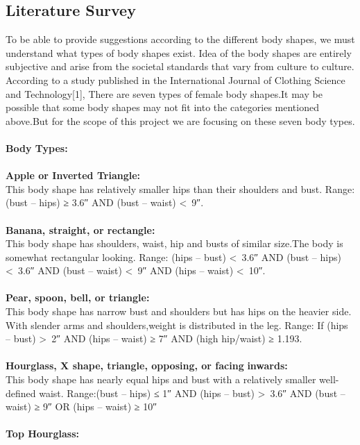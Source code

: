 \documentclass[11pt,journal,compsoc]{IEEEtran}
\begin{document}
\subsection{Literature Survey}
To be able to provide suggestions according to the different body shapes, we must understand what types of body shapes exist. Idea of the body shapes are entirely subjective and arise from the societal standards that vary from culture to culture. \\
According to a study published in the International Journal of Clothing Science and Technology[1], There are seven types of female body shapes.It may be possible that some body shapes may not fit into the categories mentioned above.But for the scope of this project we are focusing on these seven body types. \\\\
\textbf{Body Types:}\\\\
\textbullet\textbf{Apple or Inverted Triangle:} \\
This body shape has relatively smaller hips than their shoulders and bust.
Range:  (bust – hips) ≥ 3.6″ AND (bust – waist) \textless \ 9″. \\\\
\textbullet\textbf{Banana, straight, or rectangle:} \\
This body shape has shoulders, waist, hip and busts  of similar size.The body is somewhat rectangular looking.
Range: (hips – bust) \textless \ 3.6″ AND (bust – hips) \textless \ 3.6″ AND (bust – waist) \textless \ 9″ AND 
(hips – waist) \textless \  10″. \\\\
\textbullet\textbf{Pear, spoon, bell, or triangle:} \\
This body shape has narrow bust and shoulders but has hips on the heavier side. With slender arms and shoulders,weight is distributed in the leg.
Range: If (hips – bust) \textgreater \  2″ AND (hips – waist) ≥ 7″ AND (high hip/waist) ≥ 1.193. \\\\
\textbullet\textbf{Hourglass, X shape, triangle, 
opposing,  or facing } \textbf{inwards:} \\
This body shape has nearly equal hips and bust with a relatively smaller well-defined waist.
Range:(bust – hips) ≤ 1″ AND (hips – bust) \textgreater \ 3.6″ AND (bust – waist) ≥ 9″ OR (hips – waist) ≥ 10″ \\\\
\textbullet\textbf{Top Hourglass:}\\
\end{document}

